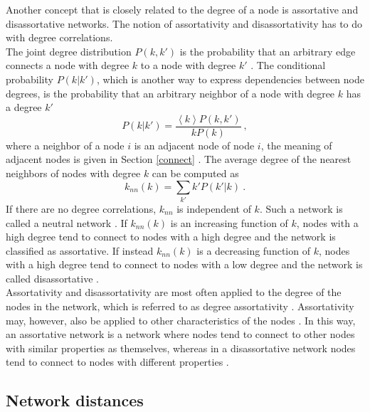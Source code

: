 \documentclass[11 pt , letterpaper , twoside , openright]{book}
\begin{document}
Another concept that is closely related to the degree of a node is assortative and disassortative networks. The notion of assortativity and disassortativity has to do with degree correlations. \\
\newline
The joint degree distribution $P(k, k')$ is the probability that an arbitrary edge connects a node with degree $k$ to a node with degree $k'$ \cite{F.Costa2007}. The conditional probability $P(k|k')$, which is another way to express dependencies between node degrees, is the probability that an arbitrary neighbor of a node with degree $k$ has a degree $k'$ 
\begin{equation}
	P(k|k') = \frac{\left<k\right>P(k, k')}{kP(k)} \ ,
\end{equation}
where a neighbor of a node $i$ is an adjacent node of node $i$, the meaning of adjacent nodes is given in Section \ref{connect} \cite{F.Costa2007}. The average degree of the nearest neighbors of nodes with degree $k$ can be computed as \cite{F.Costa2007}
\begin{equation}
	k_{nn}(k) = \sum_{k'} k'P(k'|k) \ .
\end{equation}
If there are no degree correlations, $k_{nn}$ is independent of $k$. Such a network is called a neutral network \cite{F.Costa2007}. If $k_{nn}(k)$ is an increasing function of $k$, nodes with a high degree tend to connect to nodes with a high degree and the network is classified as assortative. If instead $k_{nn}(k)$ is a decreasing function of $k$, nodes with a high degree tend to connect to nodes with a low degree and the network is called disassortative \cite{F.Costa2007}.\\
\newline
Assortativity and disassortativity are most often applied to the degree of the nodes in the network, which is referred to as degree assortativity \cite{Noldus2015}. Assortativity may, however, also be applied to other characteristics of the nodes \cite{Noldus2015}\cite{Thed2014}. In this way, an assortative network is a network where nodes tend to connect to other nodes with similar properties as themselves, whereas in a disassortative network nodes tend to connect to nodes with different properties \cite{Thed2014}.

\subsection{Network distances}
\end{document}
